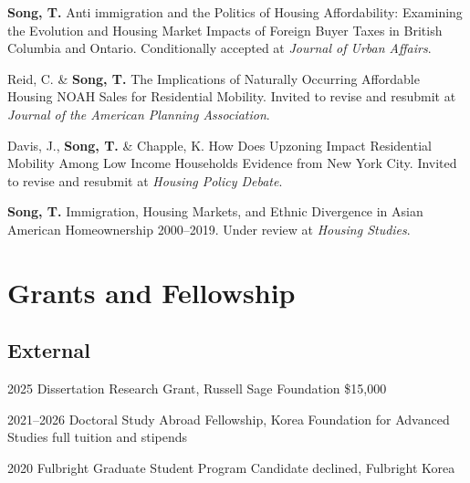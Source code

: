 \documentclass[10pt,letterpaper]{article}
\newcommand{\listitemspace}{0.25em}
\renewenvironment{itemize}
{\begin{list}{}{\setlength{\leftmargin}{1em}
\setlength{\parskip}{0em}
\setlength{\itemsep}{\listitemspace}
\setlength{\parsep}{\listitemspace}}}
{\end{list}}
\begin{document}
\begin{itemize}
  \item \textbf{Song, T.} Anti immigration and the Politics of Housing Affordability: Examining the Evolution and Housing Market Impacts of Foreign Buyer Taxes in British Columbia and Ontario. Conditionally accepted at \emph{Journal of Urban Affairs}.
  \item Reid, C. \& \textbf{Song, T.} The Implications of Naturally Occurring Affordable Housing NOAH Sales for Residential Mobility. Invited to revise and resubmit at \emph{Journal of the American Planning Association}.
  \item Davis, J., \textbf{Song, T.} \& Chapple, K. How Does Upzoning Impact Residential Mobility Among Low Income Households Evidence from New York City. Invited to revise and resubmit at \emph{Housing Policy Debate}.
  \item \textbf{Song, T.} Immigration, Housing Markets, and Ethnic Divergence in Asian American Homeownership 2000–2019. Under review at \emph{Housing Studies}.
\end{itemize}

\section{Grants and Fellowship}

\subsection{External}
\begin{tablist}
  \item[2025] \tab{}Dissertation Research Grant, Russell Sage Foundation \$15,000
  \item[2021–2026] \tab{}Doctoral Study Abroad Fellowship, Korea Foundation for Advanced Studies full tuition and stipends
  \item[2020] \tab{}Fulbright Graduate Student Program Candidate declined, Fulbright Korea
\end{tablist}
\end{document}
